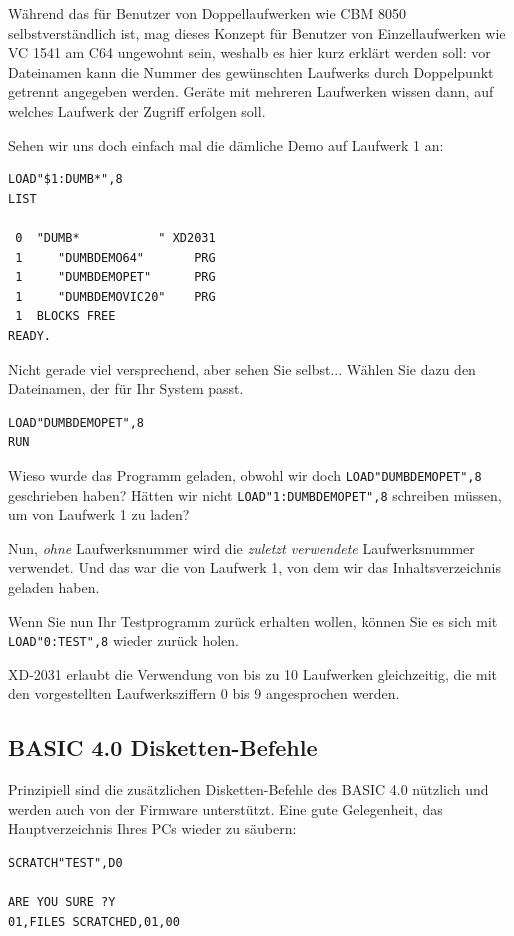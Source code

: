\documentclass[10pt,a4paper]{scrartcl}		%
\begin{document}
Während das für Benutzer von Doppellaufwerken
wie CBM 8050 selbstverständlich ist, mag dieses Konzept für Benutzer
von Einzellaufwerken wie VC 1541 am C64 ungewohnt sein, weshalb es
hier kurz erklärt werden soll: vor Dateinamen kann die Nummer des gewünschten
Laufwerks durch Doppelpunkt getrennt angegeben werden. Geräte mit
mehreren Laufwerken wissen dann, auf welches Laufwerk der Zugriff
erfolgen soll.

Sehen wir uns doch einfach mal die dämliche Demo auf Laufwerk 1 an:

\begin{verbatim}
LOAD"$1:DUMB*",8
LIST

 0  "DUMB*           " XD2031
 1     "DUMBDEMO64"       PRG
 1     "DUMBDEMOPET"      PRG
 1     "DUMBDEMOVIC20"    PRG
 1  BLOCKS FREE
READY.
\end{verbatim}

Nicht gerade viel versprechend, aber sehen Sie selbst... 
Wählen Sie dazu den Dateinamen, der für Ihr System passt.

\begin{verbatim}
LOAD"DUMBDEMOPET",8
RUN
\end{verbatim}

Wieso wurde das Programm geladen, obwohl wir doch \texttt{LOAD"DUMBDEMOPET",8} 
geschrieben haben? Hätten wir nicht \texttt{LOAD"1:DUMBDEMOPET",8} schreiben müssen,
um von Laufwerk 1 zu laden?

Nun, \textit{ohne} Laufwerksnummer wird die \textit{zuletzt verwendete}
Laufwerksnummer verwendet. Und das war die von Laufwerk 1, von dem wir
das Inhaltsverzeichnis geladen haben.

Wenn Sie nun Ihr Testprogramm zurück erhalten wollen, können Sie
es sich mit \texttt{LOAD"0:TEST",8} wieder zurück holen.

XD-2031 erlaubt die Verwendung von bis zu 10 Laufwerken gleichzeitig,
die mit den vorgestellten Laufwerksziffern 0 bis 9 angesprochen
werden.

\subsection{BASIC 4.0 Disketten-Befehle}
Prinzipiell sind die zusätzlichen Disketten-Befehle des BASIC 4.0
nützlich und werden auch von der Firmware unterstützt. 
Eine gute Gelegenheit, das Hauptverzeichnis Ihres PCs
wieder zu säubern:

\begin{verbatim}
SCRATCH"TEST",D0

ARE YOU SURE ?Y
01,FILES SCRATCHED,01,00
\end{verbatim}
\end{document}
